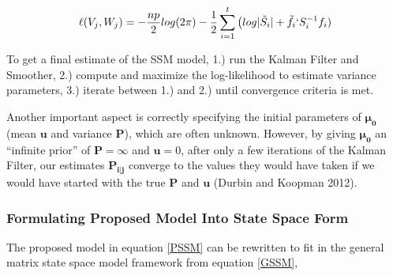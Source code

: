 \documentclass[
]{article}
\begin{document}
\begin{align*}
\ell(V_j, W_j) = -\frac{np}{2}log(2\pi)-\frac{1}{2}\sum^t_{i=1}\big(log|\tilde S_i| + \tilde f_i` S_i^{-1} f_i)
\end{align*}

To get a final estimate of the SSM model, 1.) run the Kalman Filter and Smoother, 2.) compute and maximize the log-likelihood to estimate variance parameters, 3.) iterate between 1.) and 2.) until convergence criteria is met.

Another important aspect is correctly specifying the initial parameters of \(\boldsymbol{\mu_0}\) (mean \(\boldsymbol{u}\) and variance \(\boldsymbol{P}\)), which are often unknown. However, by giving \(\boldsymbol{\mu_0}\) an ``infinite prior'' of \(\boldsymbol{P} = \infty\) and \(\boldsymbol{u} = 0\), after only a few iterations of the Kalman Filter, our estimates \(\boldsymbol{P_{i|j}}\) converge to the values they would have taken if we would have started with the true \(\boldsymbol{P}\) and \(\boldsymbol{u}\) (Durbin and Koopman 2012).

\hypertarget{formulating-proposed-model-into-state-space-form}{%
\subsubsection{Formulating Proposed Model Into State Space Form}\label{formulating-proposed-model-into-state-space-form}}

The proposed model in equation \ref{PSSM} can be rewritten to fit in the general matrix state space model framework from equation \ref{GSSM},
\end{document}

